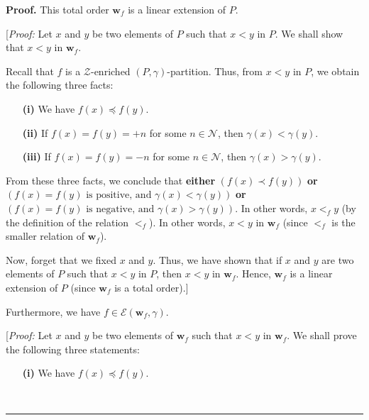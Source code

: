 \documentclass[numbers=enddot,12pt,final,onecolumn,notitlepage]{scrartcl}%
\theoremstyle{definition}
\newenvironment{proof}[1][Proof]{\noindent\textbf{#1.} }{\ \rule{0.5em}{0.5em}}
\newenvironment{verlong}{}{}
\begin{document}
\begin{verlong}
\begin{proof}
This total order $\mathbf{w}_{f}$ is a linear extension of $P$.

[\textit{Proof:} Let $x$ and $y$ be two elements of $P$ such that $x<y$ in
$P$. We shall show that $x<y$ in $\mathbf{w}_{f}$.

Recall that $f$ is a $\mathcal{Z}$-enriched $\left(  P,\gamma\right)
$-partition. Thus, from $x<y$ in $P$, we obtain the following three facts:

\begin{enumerate}
\item[\textbf{(i)}] We have $f\left(  x\right)  \preccurlyeq f\left(
y\right)  $.

\item[\textbf{(ii)}] If $f\left(  x\right)  =f\left(  y\right)  =+n$ for some
$n\in\mathcal{N}$, then $\gamma\left(  x\right)  <\gamma\left(  y\right)  $.

\item[\textbf{(iii)}] If $f\left(  x\right)  =f\left(  y\right)  =-n$ for some
$n\in\mathcal{N}$, then $\gamma\left(  x\right)  >\gamma\left(  y\right)  $.
\end{enumerate}

From these three facts, we conclude that \textbf{either} $\left(  f\left(
x\right)  \prec f\left(  y\right)  \right)  $ \newline
\textbf{or} $\left(  f\left(
x\right)  =f\left(  y\right)  \text{ is positive, and }\gamma\left(  x\right)
<\gamma\left(  y\right)  \right)  $ \newline
\textbf{or} $\left(  f\left(  x\right)
=f\left(  y\right)  \text{ is negative, and }\gamma\left(  x\right)
>\gamma\left(  y\right)  \right)  $. In other words, $x<_{f}y$ (by the
definition of the relation $<_{f}$). In other words, $x<y$ in $\mathbf{w}_{f}$
(since $<_{f}$ is the smaller relation of $\mathbf{w}_{f}$).

Now, forget that we fixed $x$ and $y$. Thus, we have shown that if $x$ and $y$
are two elements of $P$ such that $x<y$ in $P$, then $x<y$ in $\mathbf{w}_{f}%
$. Hence, $\mathbf{w}_{f}$ is a linear extension of $P$ (since $\mathbf{w}%
_{f}$ is a total order).]

Furthermore, we have $f\in\mathcal{E}\left(  \mathbf{w}_{f},\gamma\right)  $.

[\textit{Proof:} Let $x$ and $y$ be two elements of $\mathbf{w}_{f}$ such that
$x<y$ in $\mathbf{w}_{f}$. We shall prove the following three statements:

\begin{enumerate}
\item[\textbf{(i)}] We have $f\left(  x\right)  \preccurlyeq f\left(
y\right)  $.


\end{enumerate}
\end{proof}
\end{verlong}
\end{document}
